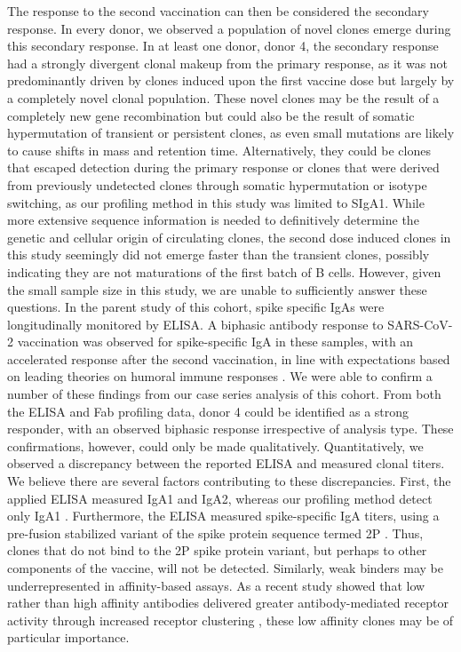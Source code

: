 The response to the second vaccination can then be considered the secondary response. In every donor, we observed a population of novel clones emerge during this secondary response. In at least one donor, donor 4, the secondary response had a strongly divergent clonal makeup from the primary response, as it was not predominantly driven by clones induced upon the first vaccine dose but largely by a completely novel clonal population. These novel clones may be the result of a completely new gene recombination but could also be the result of somatic hypermutation of transient or persistent clones, as even small mutations are likely to cause shifts in mass and retention time. Alternatively, they could be clones that escaped detection during the primary response or clones that were derived from previously undetected clones through somatic hypermutation or isotype switching, as our profiling method in this study was limited to SIgA1. While more extensive sequence information is needed to definitively determine the genetic and cellular origin of circulating clones, the second dose induced clones in this study seemingly did not emerge faster than the transient clones, possibly indicating they are not maturations of the first batch of B cells. However, given the small sample size in this study, we are unable to sufficiently answer these questions.
In the parent study of this cohort, spike specific IgAs were longitudinally monitored by ELISA. A biphasic antibody response to SARS-CoV-2 vaccination was observed for spike-specific IgA in these samples, with an accelerated response after the second vaccination, in line with expectations based on leading theories on humoral immune responses \cite{charlesajaneway2001immunological}. We were able to confirm a number of these findings from our case series analysis of this cohort. From both the ELISA and Fab profiling data, donor 4 could be identified as a strong responder, with an observed biphasic response irrespective of analysis type. These confirmations, however, could only be made qualitatively. Quantitatively, we observed a discrepancy between the reported ELISA and measured clonal titers. We believe there are several factors contributing to these discrepancies. First, the applied ELISA measured IgA1 and IgA2, whereas our profiling method detect only IgA1 \cite{keulen2021human, juncker2022comparing}. Furthermore, the ELISA measured spike-specific IgA titers, using a pre-fusion stabilized variant of the spike protein sequence termed 2P \cite{hwang2020cryo-em}. Thus, clones that do not bind to the 2P spike protein variant, but perhaps to other components of the vaccine, will not be detected. Similarly, weak binders may be underrepresented in affinity-based assays. As a recent study showed that low rather than high affinity antibodies delivered greater antibody-mediated receptor activity through increased receptor clustering \cite{yu2023reducing}, these low affinity clones may be of particular importance.
